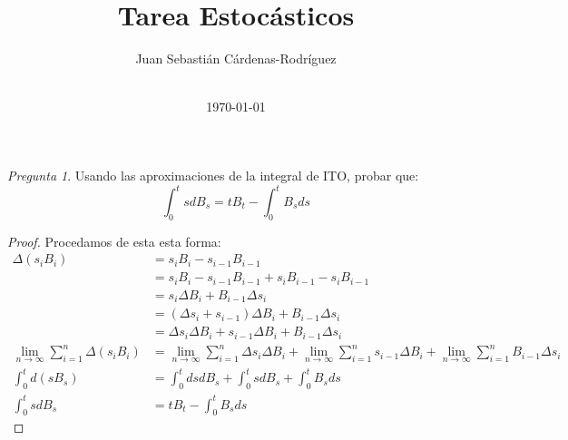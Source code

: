 \documentclass[11pt]{article}
\title{Tarea Estocásticos}
\author{Juan Sebasti\'an C\'ardenas-Rodríguez \\
  \scalebox{0.7}{Ingeniería Matemática, Universidad EAFIT} \\
  \scalebox{0.7}{201710008101}}
\date{\today}
\theoremstyle{definition}
\theoremstyle{remark}
\theoremstyle{remark}
\newtheorem{question}{Pregunta}
\begin{document}
\maketitle

\begin{question}
  Usando las aproximaciones de la integral de ITO, probar que:
  \begin{equation*}
    \int_0^tsdB_s = tB_t - \int_0^tB_sds
  \end{equation*}
\end{question}
\begin{proof}
  Procedamos de esta esta forma:
  \begin{align*}
    \Delta (s_iB_i) &= s_iB_i - s_{i-1}B_{i-1} \\
                    &= s_iB_i - s_{i-1}B_{i-1} + s_iB_{i-1} - s_iB_{i-1} \\
                    &= s_i\Delta B_i + B_{i-1}\Delta s_i \\
                    &= (\Delta s_i + s_{i-1})\Delta B_i + B_{i-1} \Delta s_i \\
                    &= \Delta s_i \Delta B_i + s_{i-1}\Delta B_i + B_{i-1} \Delta s_i \\
    \lim_{n \rightarrow \infty}\sum_{i =1}^{n} \Delta (s_i B_i) &=
    \lim_{n \rightarrow \infty}\sum_{i =1}^{n} \Delta s_i \Delta B_i +
   \lim_{n \rightarrow \infty}\sum_{i =1}^{n} s_{i-1} \Delta B_i +
   \lim_{n \rightarrow \infty}\sum_{i =1}^{n} B_{i-1} \Delta s_i \\
    \int_0^td(sB_s) &= \int_0^t ds dB_s + \int_0^t s dB_s + \int_0^tB_s ds \\
    \int_0^t s dB_s &= tB_t - \int_0^t B_s ds
  \end{align*}
\end{proof}
\end{document}
